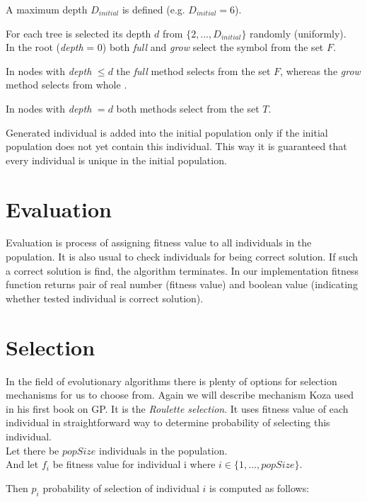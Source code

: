 \documentclass[12pt,a4paper]{report}
\newcommand{\setDots}[2]{ 
	\lbrace #1 , \dots , #2 \rbrace
}
\begin{document}
A maximum depth $D_{initial}$ is defined (e.g. $D_{initial} = 6$).

For each tree is selected its 
depth $d$ from $\setDots{2}{D_{initial}}$ randomly (uniformly).\\


In the root (\textit{depth} = 0) both \textit{full} and \textit{grow}
select the symbol from the set $F$.

In nodes with \textit{depth} $\leq d$ the \textit{full}
method selects from the set $F$, whereas the \textit{grow} method 
selects from whole \TuF.

In nodes with \textit{depth} $= d$ both methods select from the
set $T$.

Generated individual is added into the initial population only if 
the initial population does not yet contain this individual.
This way it is guaranteed that every individual is unique 
in the initial population.
  
\section{Evaluation}

Evaluation is process of assigning fitness value to all 
individuals in the population. It is also usual to check
individuals for being correct solution.
If such a correct solution is find, the algorithm terminates. 
In our implementation fitness function returns
pair of real number (fitness value) and boolean value (indicating
whether tested individual is correct solution). 

 
\newpage

\section{Selection}

In the field of evolutionary algorithms there is plenty of 
options for selection mechanisms 
for us to choose from. Again we will describe mechanism Koza
used in his first book on GP. It is the \textit{Roulette selection}.
It uses fitness value of each individual in straightforward way to determine probability of selecting this individual.\\
Let there be $popSize$ individuals in the population.\\
And let $f_{i}$ be fitness value for individual i 
where $i \in \setDots{1}{popSize}$. 

Then $p_{i}$ probability of selection of individual $i$ is computed
as follows:
\end{document}
